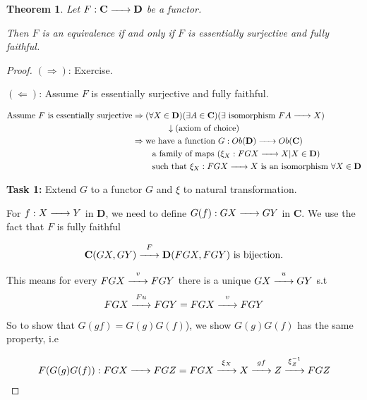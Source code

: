 \documentclass{article}
\newtheorem{theorem}{Theorem}[section]
\renewcommand{\to}{\xrightarrow{\hspace{0.5cm}}}  %
\begin{document}
    \vspace{0.2in}

    \begin{theorem}
        Let \(F: \mathbf{C} \to \mathbf{D}\) be a functor.

        Then \(F\) is an equivalence if and only if \(F\) is essentially surjective and fully faithful.
    \end{theorem}

    \begin{proof}
        \((\Rightarrow)\): Exercise.

        \((\Leftarrow)\): Assume \(F\) is essentially surjective and fully faithful.

        \[
            \begin{align}
                \text{Assume \(F\) is essentially surjective} &\Rightarrow (\forall X \in \mathbf{D})  (\exists A \in \mathbf{C})  (\exists \text{ isomorphism } FA \to X) \\
                & \quad \ \quad \ \quad \  \downarrow \text{(axiom of choice)}  \\
                &\Rightarrow \text{we have a function } G: Ob(\mathbf{D}) \to Ob(\mathbf{C}) \\
                & \quad \quad \text{ a family of maps } (\xi_X: FGX \to X | X \in \mathbf{D}) \\
                & \quad \quad \text{ such that } \xi_X: FGX \to X \text{ is an isomorphism } \forall X \in \mathbf{D} \\
            \end{align}
        \]

        \textbf{Task 1:} Extend \(G\) to a functor \(G\) and \(\xi\) to natural transformation.

        For \(f: X \to Y\) in \(\mathbf{D}\), we need to define \(G(f): GX \to GY\) in \(\mathbf{C}\).
        We use the fact that \(F\) is fully faithful

        \[
            \mathbf{C}(GX, GY) \stackrel{F}{\to} \mathbf{D}(FGX, FGY) \text{ is bijection.}
        \]

        This means for every \(FGX \stackrel{v}{\to} FGY\) there is a unique \(GX \stackrel{u}{\to} GY\) s.t
        \[
            FGX \stackrel{Fu}{\to} FGY = FGX \stackrel{v}{\to} FGY
        \]

        So to show that \(G(gf) = G(g) G(f)\)), we show \(G(g) G(f)\) has the same property, i.e

        \[
            \begin{align}
                F(G(g) G(f)) : FGX \to FGZ = FGX \stackrel{\xi_X}{\to} X \stackrel{gf}{\to} Z \stackrel{\xi_Z^{-1}}{\to} FGZ \\
            \end{align}
        \]


\end{proof}
\end{document}
